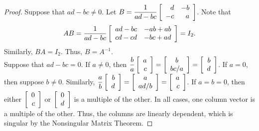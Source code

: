 \begin{proof}
Suppose that $ad-bc \neq 0$. Let $B = \dfrac{1}{ad-bc}\mtx{rr}{d&-b\\-c&a}$. Note that 
\[AB =  \dfrac{1}{ad-bc}\mtx{rr}{ad-bc & -ab+ab \\ cd-cd & -bc+ad} = I_2.\] Similarly, $BA = I_2$. Thus, $B = A^{-1}$. \\

Suppose that $ad-bc=0$. If $a\neq 0$, then $\dfrac{b}{a}\vr{a\\c} = \mtx{c}{b\\ bc/a} = \vr{b\\d}$. If $a= 0$, then suppose $b\neq 0$. Similarly, $\dfrac{a}{b}\vr{b\\d} = \mtx{c}{a\\ad/b} = \vr{a\\c}$. If $a=b=0$, then either $\vr{0\\c}$ or $\vr{0\\d}$ is a multiple of the other. In all cases, one column vector is a multiple of the other. Thus, the columns are linearly dependent, which is singular by the Nonsingular Matrix Theorem.
\end{proof}\vs

